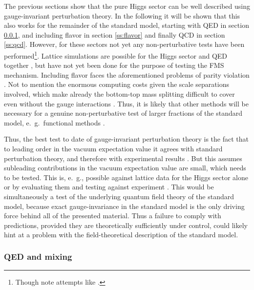 \documentclass[final,12pt]{article}
\newcommand*{\1}{1\!\!\!\bot}
\begin{document}
The previous sections show that the pure Higgs sector can be well described using gauge-invariant perturbation theory. In the following it will be shown that this also works for the remainder of the standard model, starting with QED in section \ref{ss:qed}, and including flavor in section \ref{ss:flavor} and finally QCD in section \ref{ss:qcd}. However, for these sectors not yet any non-perturbative tests have been performed\footnote{Though note attempts like \cite{Aoki:1989xe}.}. Lattice simulations are possible for the Higgs sector and QED together \cite{Zubkov:2010np,Zubkov:2011sk,Zubkov:2011ia,Lucini:2015hfa,Shrock:1985un}, but have not yet been done for the purpose of testing the FMS mechanism. Including flavor faces the aforementioned problems of parity violation \cite{Hasenfratz:2007dp,Grabowska:2015qpk,Gattringer:2008je,Cundy:2010pu,Igarashi:2009kj}. Not to mention the enormous computing costs given the scale separations involved, which make already the bottom-top mass splitting difficult to cover even without the gauge interactions \cite{Gerhold:2007gx,Gerhold:2011mx}. Thus, it is likely that other methods will be necessary for a genuine non-perturbative test of larger fractions of the standard model, e.\ g.\ functional methods \cite{Maas:2011se,Alkofer:2000wg,Gies:2006wv,Kopietz:2010zz,Binosi:2009qm,Boucaud:2011ug,Roberts:2015lja}.

Thus, the best test to date of gauge-invariant perturbation theory is the fact that to leading order in the vacuum expectation value it agrees with standard perturbation theory, and therefore with experimental results \cite{pdg}. But this assumes subleading contributions in the vacuum expectation value are small, which needs to be tested. This is, e.\ g., possible against lattice data for the Higgs sector alone \cite{Raubitzek:unpublished,Maas:unpublished} or by evaluating them and testing against experiment \cite{Egger:2017tkd,Fernbach:unpublished}. This would be simultaneously a test of the underlying quantum field theory of the standard model, because exact gauge-invariance in the standard model is the only driving force behind all of the presented material. Thus a failure to comply with predictions, provided they are theoretically sufficiently under control, could likely hint at a problem with the field-theoretical description of the standard model.

\subsubsection{QED and mixing}\label{ss:qed}
\end{document}
